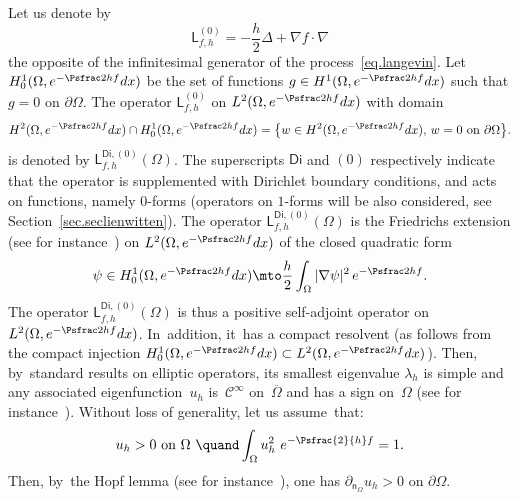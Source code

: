 Let us denote by
\begin{equation}\label{eq:inf_gen}
\mathsf L_{f,h}^{(0)} =-\frac h2 \Delta+\nabla f\cdot \nabla
\end{equation}
the opposite of the infinitesimal generator of the process~\eqref{eq.langevin}.
Let $ H^1_0(\Omega, e^{-\Psfrac 2hf}dx)$ be the set of functions $g\in H^1(\Omega, e^{-\Psfrac 2hf}dx)$ such that $g=0$ on $\partial \Omega$.
The operator $ \mathsf L_{f,h}^{(0)}$ on $L^2(\Omega, e^{-\Psfrac 2h f}dx)$ with domain
\[
H^2(\Omega, e^{-\Psfrac 2h f}dx)\cap H^1_0(\Omega, e^{-\Psfrac 2h f}dx)=\big \{w\in H^2(\Omega, e^{-\Psfrac 2h f}dx), \, w=0 \text{ on } \partial \Omega \big\}.
\]
is denoted by $ \mathsf L^{\mathsf{Di},(0)}_{f,h}(\Omega)$. The
superscripts $\mathsf{Di}$ and $(0)$ respectively indicate that the
operator is supplemented with Dirichlet
boundary conditions, and acts on functions, namely $0$-forms (operators on $1$-forms will be also considered, see Section~\ref{sec.seclienwitten}).
The operator $ \mathsf L^{\mathsf{Di},(0)}_{f,h}(\Omega) $ is the Friedrichs extension (see for instance~\cite[\S4.3]{helffer2013spectral}) on $L^2(\Omega, e^{-\Psfrac 2hf}dx)$ of the closed quadratic form
\begin{equation}\label{eq.Q}
\psi \in H^1_0(\Omega, e^{-\Psfrac 2hf}dx)\mto \frac h2 \int_\Omega \vert \nabla \psi \vert^2\, e^{-\Psfrac 2hf}.
\end{equation}
The operator $ \mathsf L^{\mathsf{Di},(0)}_{f,h}(\Omega)$ is thus a
positive self-adjoint operator on $L^2(\Omega, e^{-\Psfrac 2h
f}dx)$. In~addition, it~has a compact resolvent (as follows from the compact
injection $H^1_0(\Omega, e^{-\Psfrac 2h f}dx)\subset L^2(\Omega, e^{-\Psfrac 2h f}dx)$).
Then, by~standard results on elliptic operators, its smallest eigenvalue $ \lambda_{h}$ is simple and any associated eigenfunction~$u_{h}$ is~$\mathcal C^\infty$ on~$\overline \Omega$ and has a sign on~$\Omega$ (see for instance~\cite[\S\S6.3 \&~6.5]{Eva}).
Without \label{page.lambdah}
loss of
generality, let us assume~that:
\begin{equation}\label{eq.u_norma0}
u_h > 0 \text{ on } \Omega \ \quand \int_{\Omega} u_h^2\ e^{-\Psfrac{2}{h}f} =1.
\end{equation}
Then, by~the Hopf lemma (see for instance~\cite[\S 6.4.2]{Eva}), one has $\partial_{\mathsf n_\Omega}u_h>0$ on $\partial
\Omega$.

